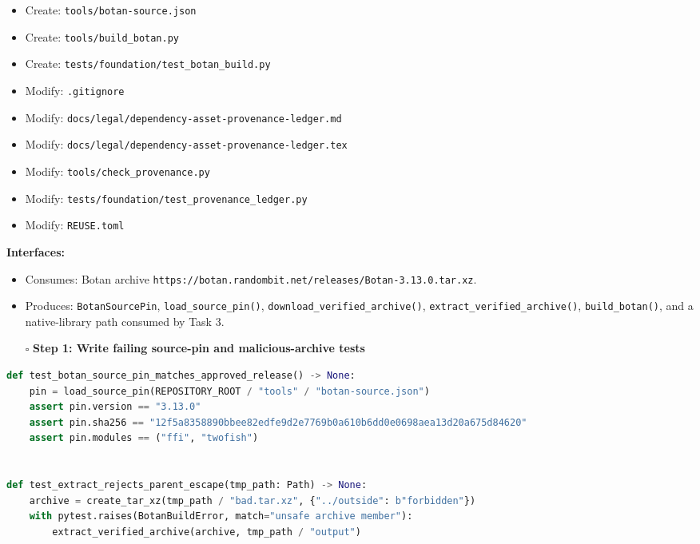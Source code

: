 \documentclass[
  letterpaper,
]{article}
\providecommand{\tightlist}{%
  \setlength{\itemsep}{0pt}\setlength{\parskip}{0pt}}
\begin{document}
\begin{itemize}
\tightlist
\item
  Create: \nolinkurl{tools/botan-source.json}
\item
  Create: \nolinkurl{tools/build_botan.py}
\item
  Create: \nolinkurl{tests/foundation/test_botan_build.py}
\item
  Modify: \nolinkurl{.gitignore}
\item
  Modify: \nolinkurl{docs/legal/dependency-asset-provenance-ledger.md}
\item
  Modify: \nolinkurl{docs/legal/dependency-asset-provenance-ledger.tex}
\item
  Modify: \nolinkurl{tools/check_provenance.py}
\item
  Modify: \nolinkurl{tests/foundation/test_provenance_ledger.py}
\item
  Modify: \nolinkurl{REUSE.toml}
\end{itemize}

\textbf{Interfaces:}

\begin{itemize}
\tightlist
\item
  Consumes: Botan archive \nolinkurl{https://botan.randombit.net/releases/Botan-3.13.0.tar.xz}.
\item
  Produces: \nolinkurl{BotanSourcePin}, \nolinkurl{load_source_pin()}, \nolinkurl{download_verified_archive()},
  \nolinkurl{extract_verified_archive()}, \nolinkurl{build_botan()}, and a native-library path consumed by Task 3.
\end{itemize}

\begin{itemize}
\tightlist
\item[$\square$]
  \textbf{Step 1: Write failing source-pin and malicious-archive tests}
\end{itemize}

\begin{lstlisting}[language=Python]
def test_botan_source_pin_matches_approved_release() -> None:
    pin = load_source_pin(REPOSITORY_ROOT / "tools" / "botan-source.json")
    assert pin.version == "3.13.0"
    assert pin.sha256 == "12f5a8358890bbee82edfe9d2e7769b0a610b6dd0e0698aea13d20a675d84620"
    assert pin.modules == ("ffi", "twofish")


def test_extract_rejects_parent_escape(tmp_path: Path) -> None:
    archive = create_tar_xz(tmp_path / "bad.tar.xz", {"../outside": b"forbidden"})
    with pytest.raises(BotanBuildError, match="unsafe archive member"):
        extract_verified_archive(archive, tmp_path / "output")
\end{lstlisting}
\end{document}
